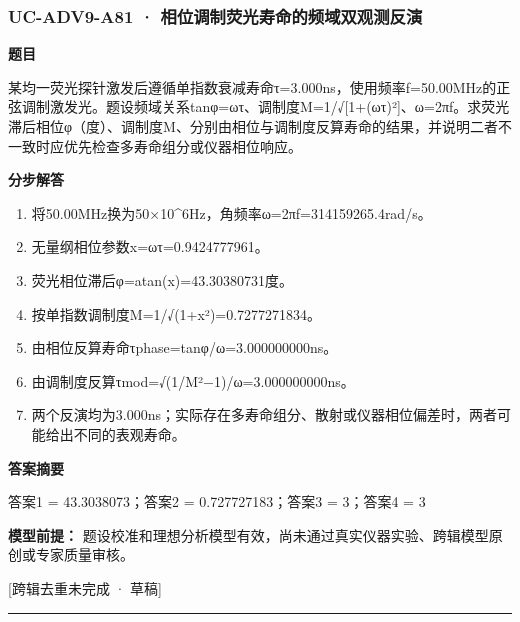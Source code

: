 \documentclass[UTF8,11pt,a4paper]{ctexart}
\begin{document}
\subsubsection*{UC-ADV9-A81 · 相位调制荧光寿命的频域双观测反演}
\noindent\textbf{题目}\par
某均一荧光探针激发后遵循单指数衰减寿命τ=3.000ns，使用频率f=50.00MHz的正弦调制激发光。题设频域关系tanφ=ωτ、调制度M=1/√[1+(ωτ)²]、ω=2πf。求荧光滞后相位φ（度）、调制度M、分别由相位与调制度反算寿命的结果，并说明二者不一致时应优先检查多寿命组分或仪器相位响应。\par
\medskip\noindent\textbf{分步解答}
\begin{enumerate}
\item 将50.00MHz换为50×10\textasciicircum{}6Hz，角频率ω=2πf=314159265.4rad/s。
\item 无量纲相位参数x=ωτ=0.9424777961。
\item 荧光相位滞后φ=atan(x)=43.30380731度。
\item 按单指数调制度M=1/√(1+x²)=0.7277271834。
\item 由相位反算寿命τphase=tanφ/ω=3.000000000ns。
\item 由调制度反算τmod=√(1/M²−1)/ω=3.000000000ns。
\item 两个反演均为3.000ns；实际存在多寿命组分、散射或仪器相位偏差时，两者可能给出不同的表观寿命。
\end{enumerate}
\noindent\textbf{答案摘要}\par
答案1 = 43.3038073；答案2 = 0.727727183；答案3 = 3；答案4 = 3\par
\noindent\textbf{模型前提：}
题设校准和理想分析模型有效，尚未通过真实仪器实验、跨辑模型原创或专家质量审核。\par
\noindent\textcolor{red!65!black}{[跨辑去重未完成 · 草稿]} \par
\medskip\hrule\medskip
{}
\end{document}
